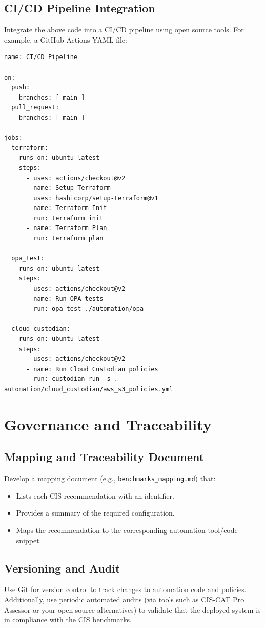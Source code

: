 \documentclass[12pt]{article}
\begin{document}
\subsection{CI/CD Pipeline Integration}
Integrate the above code into a CI/CD pipeline using open source tools. For example, a GitHub Actions YAML file:
\begin{verbatim}
name: CI/CD Pipeline

on:
  push:
    branches: [ main ]
  pull_request:
    branches: [ main ]

jobs:
  terraform:
    runs-on: ubuntu-latest
    steps:
      - uses: actions/checkout@v2
      - name: Setup Terraform
        uses: hashicorp/setup-terraform@v1
      - name: Terraform Init
        run: terraform init
      - name: Terraform Plan
        run: terraform plan

  opa_test:
    runs-on: ubuntu-latest
    steps:
      - uses: actions/checkout@v2
      - name: Run OPA tests
        run: opa test ./automation/opa

  cloud_custodian:
    runs-on: ubuntu-latest
    steps:
      - uses: actions/checkout@v2
      - name: Run Cloud Custodian policies
        run: custodian run -s . automation/cloud_custodian/aws_s3_policies.yml
\end{verbatim}

\section{Governance and Traceability}
\subsection{Mapping and Traceability Document}
Develop a mapping document (e.g., \texttt{benchmarks\_mapping.md}) that:
\begin{itemize}
    \item Lists each CIS recommendation with an identifier.
    \item Provides a summary of the required configuration.
    \item Maps the recommendation to the corresponding automation tool/code snippet.
\end{itemize}

\subsection{Versioning and Audit}
Use Git for version control to track changes to automation code and policies. Additionally, use periodic automated audits (via tools such as CIS-CAT Pro Assessor or your open source alternatives) to validate that the deployed system is in compliance with the CIS benchmarks.
\end{document}
